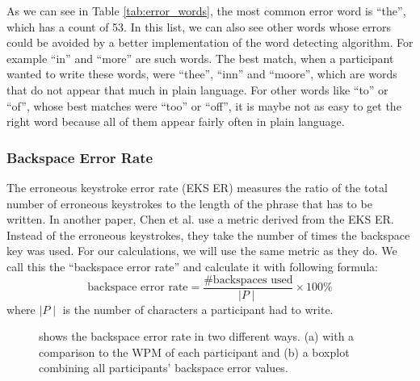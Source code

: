 As we can see in Table \ref{tab:error_words}, the most common error word is ``the'', which has a count of 53. In this list, we can also see other words whose errors could be avoided by a better implementation of the word detecting algorithm. For example ``in'' and ``more'' are such words. The best match, when a participant wanted to write these words, were ``thee'', ``inn'' and ``moore'', which are words that do not appear that much in plain language. For other words like ``to'' or ``of'', whose best matches were ``too'' or ``off'', it is maybe not as easy to get the right word because all of them appear fairly often in plain language.

\subsubsection{Backspace Error Rate}
The erroneous keystroke error rate (EKS ER) \cite{ArifTextEntry} measures the ratio of the total number of erroneous keystrokes to the length of the phrase that has to be written. In another paper, Chen et al. \cite{10.1145/3290607.3312762} use a metric derived from the EKS ER. Instead of the erroneous keystrokes, they take the number of times the backspace key was used. For our calculations, we will use the same metric as they do. We call this the ``backspace error rate'' and calculate it with following formula:
\begin{equation}
    \text{backspace error rate} = \frac{\text{\#backspaces used}}{\mid P \mid} \times 100\%
\end{equation}
where $\mid P \mid$ is the number of characters a participant had to write.
\iffalse
\begin{figure}[H]
    \centering
    \vspace{2em}
    \caption{shows the backspace error rate in two different ways. (a) with a comparison to the WPM of each participant and (b) a boxplot combining all participants' backspace error values.}
    \label{fig:error_backspace}
\end{figure}
